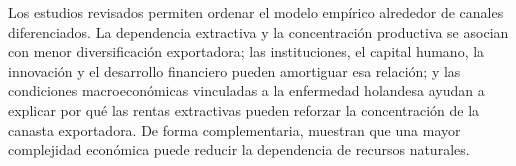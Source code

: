 \documentclass[../../PTFM.tex]{subfiles}
\begin{document}
	Los estudios revisados permiten ordenar el modelo empírico alrededor de canales diferenciados. La dependencia extractiva y la concentración productiva se asocian con menor diversificación exportadora; las instituciones, el capital humano, la innovación y el desarrollo financiero pueden amortiguar esa relación; y las condiciones macroeconómicas vinculadas a la enfermedad holandesa ayudan a explicar por qué las rentas extractivas pueden reforzar la concentración de la canasta exportadora. De forma complementaria, \textcite{Destek2023} muestran que una mayor complejidad económica puede reducir la dependencia de recursos naturales.

\end{document}

